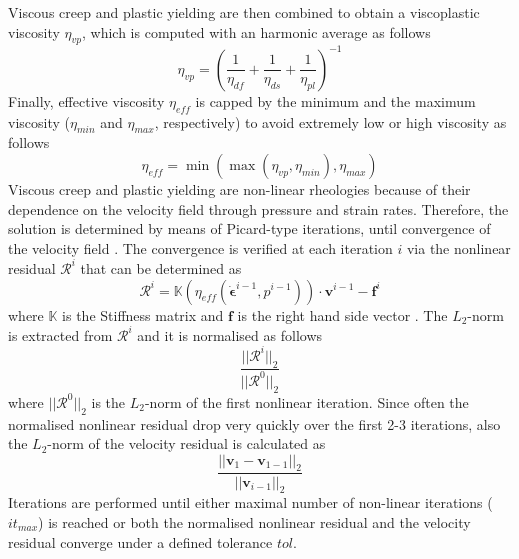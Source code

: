 \documentclass[hidelinks,10pt,a4paper]{article}
\begin{document}
Viscous creep and plastic yielding are then combined to obtain a viscoplastic viscosity $\eta_{vp}$, which is computed with an harmonic average
\citep{Tackley2010,Glerum2018} as follows
\begin{equation}\label{eq:viscoplastic}
\eta_{vp}=\left(\frac{1}{\eta_{df}}+\frac{1}{\eta_{ds}}+\frac{1}{\eta_{pl}}\right)^{-1}
\end{equation}
Finally, effective viscosity $\eta_{eff}$ is capped by the minimum and the maximum viscosity ($\eta_{min}$ and $\eta_{max}$, respectively) to avoid extremely
low or high viscosity \citep{Glerum2018} as follows
\begin{equation}\label{eq:effective}
\eta_{eff}=\min(\max(\eta_{vp},\eta_{min}),\eta_{max})
\end{equation}
Viscous creep and plastic yielding are non-linear rheologies because of their dependence on the velocity field through pressure and strain rates. Therefore,
the solution is determined by means of Picard-type iterations, until convergence of the velocity field \citep{Glerum2018}. The convergence is verified at each
iteration $i$ via the nonlinear residual $\bm{\mathcal{R}}^i$ that can be determined as
\begin{equation}\label{eq:convergence}
\bm{\mathcal{R}}^i= \mathbb{K} (\eta_{eff}(\dot{\bm{\epsilon}}^{i-1},p^{i-1}))\cdot \bm{v}^{i-1} - \bm{f}^i
\end{equation}
where $\mathbb{K}$ is the Stiffness matrix and $\bm{f}$ is the right hand side vector \citep{Spiegelman2016,Glerum2018}.  The $L_2$-norm is extracted from
$\bm{\mathcal{R}}^i$ and it is normalised as follows
\begin{equation}\label{eq:convergence_res}
\frac{||\bm{\mathcal{R}}^i||_2}{||\bm{\mathcal{R}}^0||_2}
\end{equation}
where $||\bm{\mathcal{R}}^0||_2$ is the $L_2$-norm of the first nonlinear iteration.
Since often the normalised nonlinear residual drop very quickly over the first 2-3 iterations, also the $L_2$-norm of the velocity residual is calculated as
\begin{equation}\label{eq:convergence_vel}
\frac{||\bm{v}_1-\bm{v}_{1-1}||_2}{||\bm{v}_{i-1}||_2}
\end{equation}
Iterations are performed until either maximal number of non-linear iterations ($it_{max}$) is reached or both the normalised nonlinear residual and the
velocity residual converge under a defined tolerance $tol$.
\end{document}
